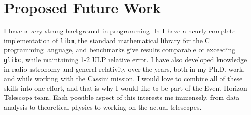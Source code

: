 \documentclass{article}
\begin{document}
    \section{Proposed Future Work}
        I have a very strong background in programming. In
        \cite{libtmpl} I have a nearly complete implementation of
        \texttt{libm}, the standard mathematical library for the C programming
        language, and benchmarks give results comparable or exceeding
        \texttt{glibc}, while maintaining 1-2 ULP relative error.
        I have also developed
        knowledge in radio astronomy and general relativity over the years,
        both in my Ph.D. work, and while working with the Cassini mission.
        I would love to combine all of these skills into one effort, and that
        is why I would like to be part of the Event Horizon Telescope team.
        Each possible aspect of this interests me immensely, from data analysis
        to theoretical physics to working on the actual telescopes.
    
    
\end{document}

